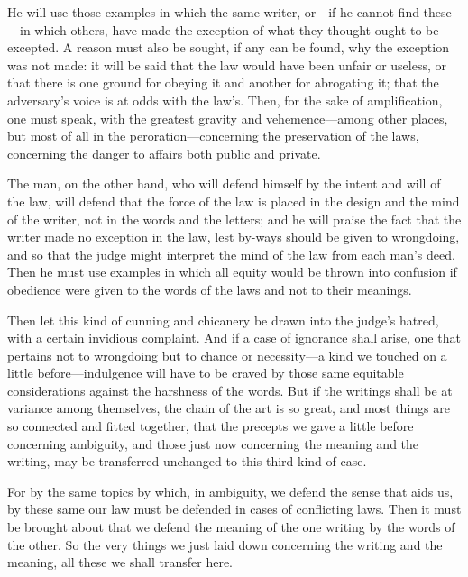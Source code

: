  He will use those examples in which the same writer, or—if he cannot find these—in which others, have made the exception of what they thought ought to be excepted. A reason must also be sought, if any can be found, why the exception was not made: it will be said that the law would have been unfair or useless, or that there is one ground for obeying it and another for abrogating it; that the adversary's voice is at odds with the law's. Then, for the sake of amplification, one must speak, with the greatest gravity and vehemence—among other places, but most of all in the peroration—concerning the preservation of the laws, concerning the danger to affairs both public and private.

 The man, on the other hand, who will defend himself by the intent and will of the law, will defend that the force of the law is placed in the design and the mind of the writer, not in the words and the letters; and he will praise the fact that the writer made no exception in the law, lest by-ways should be given to wrongdoing, and so that the judge might interpret the mind of the law from each man's deed. Then he must use examples in which all equity would be thrown into confusion if obedience were given to the words of the laws and not to their meanings.

 Then let this kind of cunning and chicanery be drawn into the judge's hatred, with a certain invidious complaint. And if a case of ignorance shall arise, one that pertains not to wrongdoing but to chance or necessity—a kind we touched on a little before—indulgence will have to be craved by those same equitable considerations against the harshness of the words. But if the writings shall be at variance among themselves, the chain of the art is so great, and most things are so connected and fitted together, that the precepts we gave a little before concerning ambiguity, and those just now concerning the meaning and the writing, may be transferred unchanged to this third kind of case.

 For by the same topics by which, in ambiguity, we defend the sense that aids us, by these same our law must be defended in cases of conflicting laws. Then it must be brought about that we defend the meaning of the one writing by the words of the other. So the very things we just laid down concerning the writing and the meaning, all these we shall transfer here.

